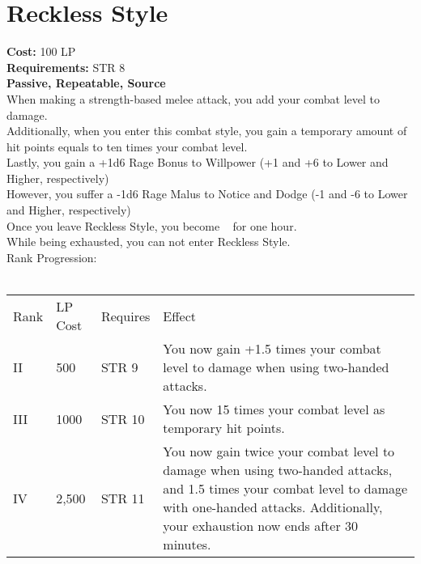 \section{Reckless Style}\label{perk:recklessStyle}
\textbf{Cost:} 100 LP\\
\textbf{Requirements:} STR 8\\
\textbf{Passive, Repeatable, Source}\\
When making a strength-based melee attack, you add your combat level to damage.\\
Additionally, when you enter this combat style, you gain a temporary amount of hit points equals to ten times your combat level.\\
Lastly, you gain a +1d6 Rage Bonus to Willpower (+1 and +6 to Lower and Higher, respectively)\\
However, you suffer a -1d6 Rage Malus to Notice and Dodge (-1 and -6 to Lower and Higher, respectively)\\
Once you leave Reckless Style, you become ~ for one hour.\\
While being exhausted, you can not enter Reckless Style.\\
Rank Progression:\\
\\
\begin{tabular}{l | l | l | l}
    Rank & LP Cost & Requires & Effect\\
    II & 500 & STR 9 & You now gain +1.5 times your combat level to damage when using two-handed attacks.\\
    III & 1000 & STR 10 & You now 15 times your combat level as temporary hit points.\\
    IV & 2,500 & STR 11 & You now gain twice your combat level to damage when using two-handed attacks, and 1.5 times your combat level to damage with one-handed attacks.
    Additionally, your exhaustion now ends after 30 minutes.\\
\end{tabular}
